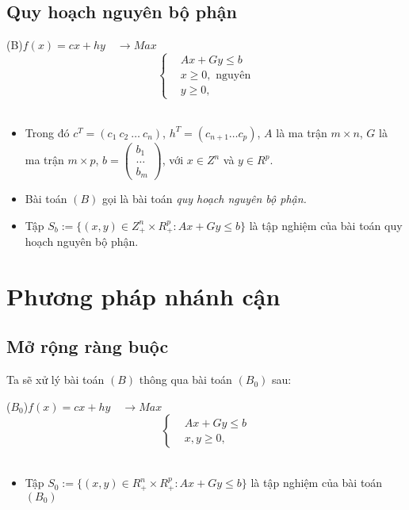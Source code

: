 \documentclass{beamer}
\begin{document}
\subsection{Quy hoạch nguyên bộ phận}
\begin{frame}
    \begin{center}                    
        \big(B\big)\quad $f(x)=cx+hy \quad \longrightarrow Max$ \\
        \[\left\{\begin{aligned}
            &Ax+Gy \leq  b \\
            &x\geq 0, \text{ nguyên} \\
            &y\geq 0,
        \end{aligned}\right.\]\\
    \end{center}
    \begin{itemize}
    \item Trong đó $c^T=(c_1 \: c_2 \: \ldots \: c_n)$, $h^T=(c_{n+1} \ldots c_p)$, $A$ là ma trận $m\times n$, $G$ là ma trận $m\times p$, $b=\begin{pmatrix}
        b_1 \\
        \ldots \\
        b_m
        \end{pmatrix}$, với $x\in Z^n$ và $y\in R^p$.
    \item Bài toán $(B)$ gọi là bài toán \textit{quy hoạch nguyên bộ phận.}
    \item Tập $S_b:=\{(x,y)\in Z^n_+\times R^p_+: Ax+Gy\leq b\}$ là tập nghiệm của bài toán quy hoạch nguyên bộ phận.
    \end{itemize}
\end{frame}
\section{Phương pháp nhánh cận}
\subsection{Mở rộng ràng buộc}
\begin{frame}
    Ta sẽ xử lý bài toán $(B)$ thông qua bài toán $(B_0)$ sau:
    \begin{center}                    
        \big($B_0$\big)\quad $f(x)=cx+hy \quad \longrightarrow Max$ \\
        \[\left\{\begin{aligned}
            &Ax+Gy \leq  b \\
            &x,y \geq 0,
        \end{aligned}\right.\]\\
    \end{center}
\begin{itemize}
\item Tập $S_0:=\{(x,y)\in R^n_+\times R^p_+: Ax+Gy\leq b\}$ là tập nghiệm của bài toán $(B_0)$
\end{itemize}
\end{frame}
\begin{frame}
    
\end{frame}
\end{document}
